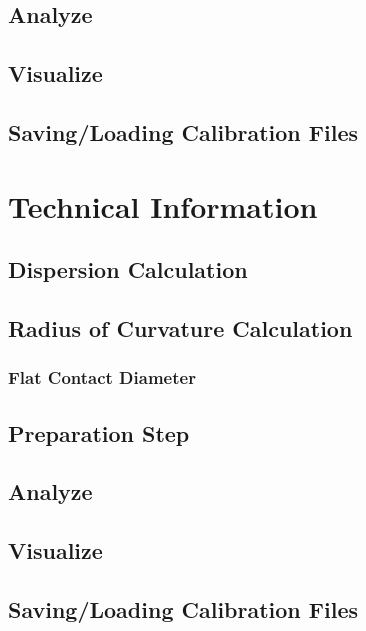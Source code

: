 \documentclass[12pt]{extarticle}
\begin{document}
	\subsection{Analyze}

	\subsection{Visualize}

	\subsection{Saving/Loading Calibration Files}

\section{Technical Information}
	\subsection{Dispersion Calculation}

	\subsection{Radius of Curvature Calculation}

		\subsubsection{Flat Contact Diameter}

	\subsection{Preparation Step}

	\subsection{Analyze}

	\subsection{Visualize}

	\subsection{Saving/Loading Calibration Files}
\end{document}
